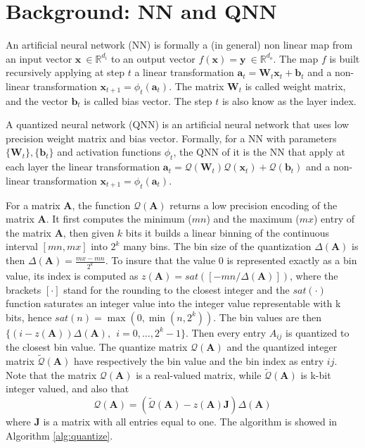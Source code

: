 \section{Background: NN and QNN}\label{sec:background}


An artificial neural network (NN) is formally a (in general) non linear map from an input vector $\mathbf{x} \ \in \mathbb{R}^{d_i}$ to an output vector $f(\mathbf{x} ) = \mathbf{y} \ \in \mathbb{R}^{d_o}$. The map $f$ is built recursively applying at step $t$ a linear transformation $ \mathbf{a}_t = \mathbf{W}_t\mathbf{x}_t + \mathbf{b}_t$ and a non-linear transformation $\mathbf{x}_{t+1} = \phi_t(\mathbf{a}_t)$. The matrix $\mathbf{W}_t$ is called weight matrix, and the vector $\mathbf{b}_t$ is called bias vector. The step $t$ is also know as the layer index. 

A quantized neural network (QNN) is an artificial neural network that uses low precision weight matrix and bias vector. Formally, for a NN with parameters $\{\mathbf{W}_t\}, \{\mathbf{b}_t\}$ and activation functions $\phi_t$, the QNN of it is the NN that apply at each layer the linear transformation $\mathbf{a}_t = \mathcal{Q}(\mathbf{W}_t) \mathcal{Q}(\mathbf{x}_t) + \mathcal{Q}(\mathbf{b}_t)$ and a non-linear transformation $\mathbf{x}_{t+1} = \phi_t(\mathbf{a}_t)$. 

 For a matrix $\mathbf{A}$, the function $\mathcal{Q}(\mathbf{A})$ returns a low precision encoding of the matrix $\mathbf{A}$. It first computes the minimum ($mn$) and the maximum ($mx$) entry of the matrix $\mathbf{A}$, then given $k$ bits it builds a linear binning of the continuous interval $[mn,mx]$ into $2^k$ many bins. The bin size of the quantization $\Delta(\mathbf{A})$ is then $\Delta(\mathbf{A}) = \frac{mx - mn}{2^k}$. To insure that the value $0$ is represented exactly as a bin value, its index is computed as $z(\mathbf{A}) = sat([-mn/\Delta(\mathbf{A})])$, where the brackets $[\cdot]$ stand for the rounding to the closest integer and the $sat(\cdot)$ function saturates an integer value into the integer value representable with k bits, hence $sat(n) = \max(0, \min(n,2^k) )$. The bin values are then $\{ (i-z(\mathbf{A})) \Delta(\mathbf{A}), \ \ i = 0, \dots, 2^k -1 \}$. Then every entry $A_{ij}$ is quantized to the closest bin value. The quantize matrix  $\mathcal{Q}(\mathbf{A})$ and the quantized integer matrix $\tilde{\mathcal{Q}}(\mathbf{A})$ have respectively the bin value and the bin index as entry $ij$. Note that the matrix $\mathcal{Q}(\mathbf{A})$ is a real-valued matrix, while $\tilde{\mathcal{Q}}(\mathbf{A})$ is k-bit integer valued, and also that
\begin{equation}\label{eq:affine_transf}
\mathcal{Q}(\mathbf{A}) = (\tilde{\mathcal{Q}}(\mathbf{A}) -z(\mathbf{A}) \mathbf{J}  ) \Delta(\mathbf{A})
\end{equation} 
where $\mathbf{J}$ is a matrix with all entries equal to one. The algorithm is showed in Algorithm \ref{alg:quantize}.

